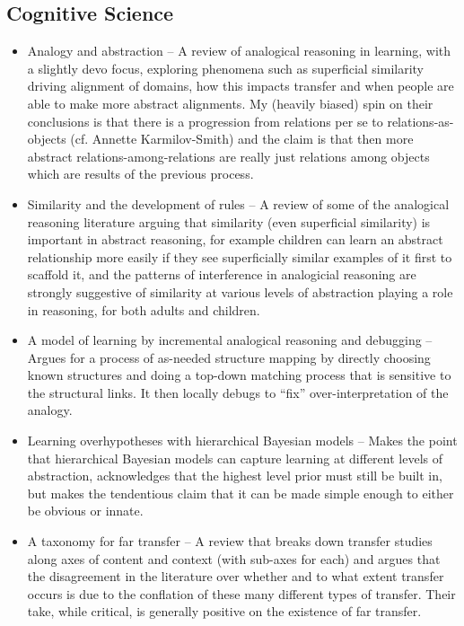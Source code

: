 \documentclass[10pt]{article}
\begin{document}
\subsection{Cognitive Science}
\begin{itemize}
\item Analogy and abstraction -- A review of analogical reasoning in learning, with a slightly devo focus, exploring phenomena such as superficial similarity driving alignment of domains, how this impacts transfer and when people are able to make more abstract alignments. My (heavily biased) spin on their conclusions is that there is a progression from relations per se to relations-as-objects (cf. Annette Karmilov-Smith) and the claim is that then more abstract relations-among-relations are really just relations among objects which are results of the previous process. \citep{Gentner2017}
\item Similarity and the development of rules -- A review of some of the analogical reasoning literature arguing that similarity (even superficial similarity) is important in abstract reasoning, for example children can learn an abstract relationship more easily if they see superficially similar examples of it first to scaffold it, and the patterns of interference in analogicial reasoning are strongly suggestive of similarity at various levels of abstraction playing a role in reasoning, for both adults and children.
\item A model of learning by incremental analogical reasoning and debugging -- Argues for a process of as-needed structure mapping by directly choosing known structures and doing a top-down matching process that is sensitive to the structural links. It then locally debugs to ``fix'' over-interpretation of the analogy. \citep{Burnstein1983}
\item Learning overhypotheses with hierarchical Bayesian models -- Makes the point that hierarchical Bayesian models can capture learning at different levels of abstraction, acknowledges that the highest level prior must still be built in, but makes the tendentious claim that it can be made simple enough to either be obvious or innate. \citep{Kemp2007}
\item A taxonomy for far transfer -- A review that breaks down transfer studies along axes of content and context (with sub-axes for each) and argues that the disagreement in the literature over whether and to what extent transfer occurs is due to the conflation of these many different types of transfer. Their take, while critical, is generally positive on the existence of far transfer. \citep{Barnett2002}

\end{itemize}
\end{document}
